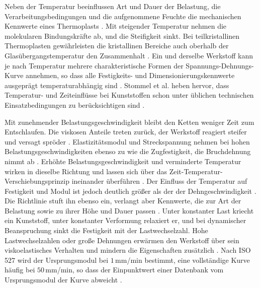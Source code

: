 Neben der Temperatur beeinflussen Art und Dauer der Belastung, die Verarbeitungsbedingungen und die aufgenommene Feuchte die mechanischen Kennwerte eines Thermoplasts \cite[S.~7]{VDI2736-1}. Mit steigender Temperatur nehmen die molekularen Bindungskräfte ab, und die Steifigkeit sinkt. Bei teilkristallinen Thermoplasten gewährleisten die kristallinen Bereiche auch oberhalb der Glasübergangstemperatur den Zusammenhalt \cite[S.~7]{VDI2736-1}. Ein und derselbe Werkstoff kann je nach Temperatur mehrere charakteristische Formen der Spannungs-Dehnungs-Kurve annehmen, so dass alle Festigkeits- und Dimensionierungskennwerte ausgeprägt temperaturabhängig sind \cite[S.~116 bis 117]{Erh08}. Stommel et al. heben hervor, dass Temperatur- und Zeiteinflüsse bei Kunststoffen schon unter üblichen technischen Einsatzbedingungen zu berücksichtigen sind \cite[S.~31]{Sto18}.

Mit zunehmender Belastungsgeschwindigkeit bleibt den Ketten weniger Zeit zum Entschlaufen. Die viskosen Anteile treten zurück, der Werkstoff reagiert steifer und versagt spröder \cite[S.~30]{Sto18}. Elastizitätsmodul und Streckspannung nehmen bei hohen Belastungsgeschwindigkeiten ebenso zu wie die Zugfestigkeit, die Bruchdehnung nimmt ab \cite[S.~7]{VDI2736-1}. Erhöhte Belastungsgeschwindigkeit und verminderte Temperatur wirken in dieselbe Richtung und lassen sich über das Zeit-Temperatur-Verschiebungsprinzip ineinander überführen \cite[S.~30 und 44]{Sto18}. Der Einfluss der Temperatur auf Festigkeit und Modul ist jedoch deutlich größer als der der Dehngeschwindigkeit \cite[S.~118]{Erh08}. Die Richtlinie stuft ihn ebenso ein, verlangt aber Kennwerte, die zur Art der Belastung sowie zu ihrer Höhe und Dauer passen \cite[S.~7]{VDI2736-1}. Unter konstanter Last kriecht ein Kunststoff, unter konstanter Verformung relaxiert er, und bei dynamischer Beanspruchung sinkt die Festigkeit mit der Lastwechselzahl. Hohe Lastwechselzahlen oder große Dehnungen erwärmen den Werkstoff über sein viskoelastisches Verhalten und mindern die Eigenschaften zusätzlich \cite[S.~7]{VDI2736-1}. Nach ISO 527 wird der Ursprungsmodul bei $1$\,mm/min bestimmt, eine vollständige Kurve häufig bei $50$\,mm/min, so dass der Einpunktwert einer Datenbank vom Ursprungsmodul der Kurve abweicht \cite[S.~31]{Sto18}.


